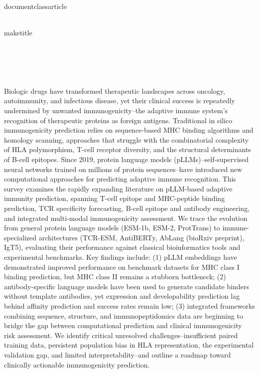 \\documentclass{article}
\begin{document}
\\maketitle
\title{}

\section{}

Biologic drugs have transformed therapeutic landscapes across oncology, autoimmunity, and infectious disease, yet their clinical success is repeatedly undermined by unwanted immunogenicity--the adaptive immune system's recognition of therapeutic proteins as foreign antigens. Traditional in silico immunogenicity prediction relies on sequence-based MHC binding algorithms and homology scanning, approaches that struggle with the combinatorial complexity of HLA polymorphism, T-cell receptor diversity, and the structural determinants of B-cell epitopes. Since 2019, protein language models (pLLMs)--self-supervised neural networks trained on millions of protein sequences--have introduced new computational approaches for predicting adaptive immune recognition. This survey examines the rapidly expanding literature on pLLM-based adaptive immunity prediction, spanning T-cell epitope and MHC-peptide binding prediction, TCR specificity forecasting, B-cell epitope and antibody engineering, and integrated multi-modal immunogenicity assessment. We trace the evolution from general protein language models (ESM-1b, ESM-2, ProtTrans) to immune-specialized architectures (TCR-ESM, AntiBERTy, AbLang (bioRxiv preprint), IgT5), evaluating their performance against classical bioinformatics tools and experimental benchmarks. Key findings include: (1) pLLM embeddings have demonstrated improved performance on benchmark datasets for MHC class I binding prediction, but MHC class II remains a stubborn bottleneck; (2) antibody-specific language models have been used to generate candidate binders without template antibodies, yet expression and developability prediction lag behind affinity prediction and success rates remain low; (3) integrated frameworks combining sequence, structure, and immunopeptidomics data are beginning to bridge the gap between computational prediction and clinical immunogenicity risk assessment. We identify critical unresolved challenges--insufficient paired training data, persistent population bias in HLA representation, the experimental validation gap, and limited interpretability--and outline a roadmap toward clinically actionable immunogenicity prediction.

\section{}
\end{document}
